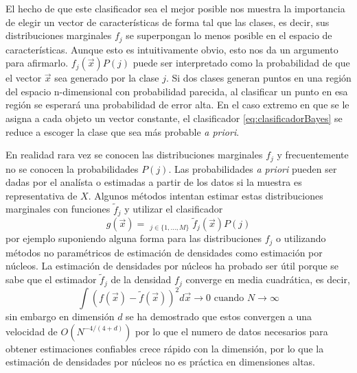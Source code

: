 \documentclass[letterpaper,12pt]{book}
\DeclareMathOperator*{\argmax}{arg\,m\acute{a}x}
\begin{document}
El hecho de que este clasificador sea el mejor posible nos muestra la importancia de elegir un vector de características de forma tal que las clases, es decir, sus distribuciones marginales $f_j$ se superpongan lo menos posible en el espacio de características. Aunque esto es intuitivamente obvio, esto nos da un argumento para afirmarlo. $f_j(\vec{x})P(j)$ puede ser interpretado como la probabilidad de que el vector $\vec{x}$ sea generado por la clase $j$. Si dos clases generan puntos en una región del espacio n-dimensional con probabilidad parecida, al clasificar un punto en esa región se esperará una probabilidad de error alta. En el caso extremo en que se le asigna a cada objeto un vector constante, el clasificador \ref{eq:clasificadorBayes} se reduce a escoger la clase que sea más probable \textit{a priori}.

En realidad rara vez se conocen las distribuciones marginales $f_j$ y frecuentemente no se conocen la probabilidades $P(j)$. Las probabilidades \textit{a priori} pueden ser dadas por el analísta o estimadas a partir de los datos si la muestra es representativa de $X$. Algunos métodos intentan estimar estas distribuciones marginales con funciones $\tilde{f}_j$ y utilizar el clasificador 
\begin{equation}
  g(\vec{x}) = \argmax_{j\in\{1,\dots,M\}}\tilde{f}_j(\vec{x})P(j)
\end{equation}
por ejemplo suponiendo alguna forma para las distribuciones $f_j$ o utilizando métodos no paramétricos de estimación de densidades como estimación por núcleos. La estimación de densidades por núcleos ha probado ser útil porque se sabe que el estimador $\tilde{f}_{j}$ de la densidad $f_j$ converge en media cuadrática, es decir,
\begin{equation}
  \int\left(f(\vec{x})-\tilde{f}(\vec{x})\right)^2d\vec{x}\rightarrow 0\text{ cuando } N\to\infty
\end{equation}
 sin embargo en dimensión $d$ se ha demostrado que estos convergen a una velocidad de $O(N^{-4/(4+d)})$ \cite{scott_multivariate_2009} por lo que el numero de datos necesarios para obtener estimaciones confiables crece rápido con la dimensión, por lo que la estimación de densidades por núcleos no es práctica en dimensiones altas. 
\end{document}
